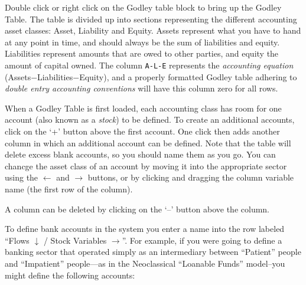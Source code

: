 Double click or right click on the Godley table block to bring up the
Godley Table. The table is divided up into sections representing the
different accounting asset classes: Asset, Liability and
Equity. Assets represent what you have to hand at any point in time,
and should always be the sum of liabilities and equity. Liabilities
represent amounts that are owed to other parties, and equity the
amount of capital owned. The column \verb+A-L-E+ represents the {\em
  accounting equation} (Assets$-$Liabilities$-$Equity), and a properly
formatted Godley table adhering to {\em double entry accounting
  conventions} will have this column zero for all rows.

When a Godley Table is first loaded, each accounting class has room
for one account (also known as a {\em stock}) to be defined. To create
an additional accounts, click on the `+' button above the first
account. One click then adds another column in which an additional
account can be defined. Note that the table will delete excess blank
accounts, so you should name them as you go. You can chancge the asset
class of an account by moving it into the appropriate sector using the
$\leftarrow$ and $\rightarrow$ buttons, or by clicking and dragging
the column variable name (the first row of the column).


\begin{center}
\end{center}


A column can be deleted by clicking on the `--' button above the column.

To define bank accounts in the system you enter a name into the row
labeled ``Flows $\downarrow$ / Stock Variables $\rightarrow$''. For example, if you were
going to define a banking sector that operated simply as an
intermediary between ``Patient'' people and ``Impatient'' people---as
in the Neoclassical ``Loanable Funds'' model--you might define the
following accounts: 

